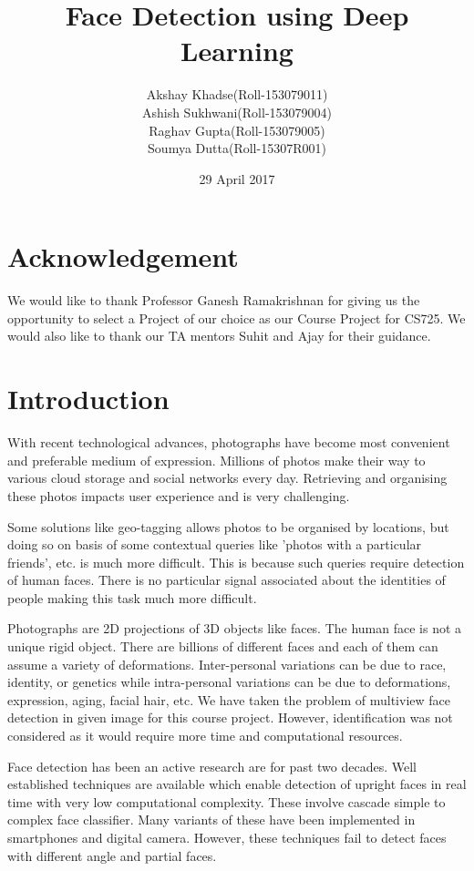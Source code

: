 \documentclass{article}
\title{Face Detection using Deep Learning}
\author{Akshay Khadse(Roll-153079011)\\
Ashish Sukhwani(Roll-153079004)\\
Raghav Gupta(Roll-153079005)\\
Soumya Dutta(Roll-15307R001)}
\date{29 April 2017}
\begin{document}
\maketitle
\newpage
\tableofcontents
\newpage
\section*{Acknowledgement}
We would like to thank Professor Ganesh Ramakrishnan for giving us the opportunity to select a Project of our choice as our Course Project for CS725. We would also like to thank our TA mentors Suhit and Ajay for their guidance.
\newpage

\section{Introduction}
With recent technological advances, photographs have become most convenient and preferable medium of expression. Millions of photos make their way to various cloud storage and social networks every day. Retrieving and organising these photos impacts user experience and is very challenging.

\par
Some solutions like geo-tagging allows photos to be organised by locations, but doing so on basis of some contextual queries like 'photos with a particular friends', etc. is much more difficult. This is because such queries require detection of human faces. There is no particular signal associated about the identities of people making this task much more difficult.

\par
Photographs are 2D projections of 3D objects like faces. The human face is not a unique rigid object. There are billions of different faces and each of them can assume a variety of deformations. Inter-personal variations can be due to race, identity, or genetics while intra-personal variations can be due to deformations, expression, aging, facial hair, etc. We have taken the problem of multiview face detection in given image for this course project. However, identification was not considered as it would require more time and computational resources.

\par
Face detection has been an active research are for past two decades. Well established techniques are available which enable detection of upright faces in real time with very low computational complexity. These involve cascade simple to complex face classifier. Many variants of these have been implemented in smartphones and digital camera. However, these techniques fail to detect faces with different angle and partial faces.
\end{document}
